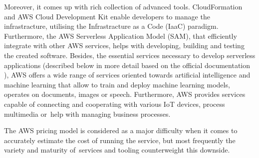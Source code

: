 Moreover, it comes up with rich collection of advanced tools. CloudFormation and AWS Cloud Development Kit enable developers to manage the infrastracture, utilising the Infrastracture as a Code (IaaC) paradigm. Furthermore, the AWS Serverless Application Model (SAM), that efficiently integrate with other AWS services, helps with developing, building and testing the created software. Besides, the essential services necessary to develop serverless applications (described below in more detail based on the official documentation \cite{AWSServerlessOffering}), AWS offers a wide range of services oriented towards artificial intelligence and machine learning that allow to train and deploy machine learning models, operates on documents, images or speech. Furthermore, AWS provides services capable of connecting and cooperating with various IoT devices, process multimedia or~help with managing business processes.

The AWS pricing model is considered as a major difficulty when it comes to accurately estimate the cost of running the service, but most frequently the variety and maturity of~services and tooling counterweight this downside.

